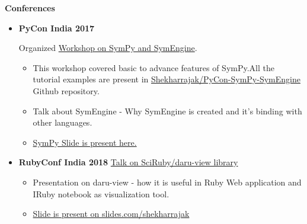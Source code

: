 \documentclass[letterpaper,12pt]{article}[leftmargin=*]
\def \entryspacing {-0pt}
\renewcommand{\section}[2]{\vspace{5pt}
  \colorbox{secondary}{\color{white}\raggedbottom\normalsize\textbf{{#1}{\hspace{7pt}#2}}}
}
\newcommand{\resumeEntryStart}{\begin{itemize}[leftmargin=2.5mm]}
\newcommand{\resumeEntryEnd}{\end{itemize}\vspace{\entryspacing}}
\newcommand{\resumeEntryS}[2]{
  \item[]\small{
    \textbf{\color{primary}#1 }{ #2 \vspace{-6pt}}
  }
}
\begin{document}
\section{\faBook}{Conferences}
 \resumeEntryStart
  \resumeEntryS{PyCon India 2017} {Organized \href{https://shekharrajak.github.io/blog/Talks/SymPy/PyConIndia-Delhi-2017}{ Workshop on SymPy and SymEngine}.
  \begin{itemize}
      \item This workshop covered basic to advance features of SymPy.All the tutorial examples are present in \href{https://github.com/Shekharrajak/PyCon-SymPy-SymEngine}{Shekharrajak/PyCon-SymPy-SymEngine} Github repository.

      \item Talk about SymEngine - Why SymEngine is created and it's binding with other languages.

      \item \href{https://shekharrajak.github.io/PyCon-SymPy-SymEngine/slides-pyconindia2017}{SymPy Slide is present here. }
  \end{itemize}}

  \resumeEntryS{RubyConf India 2018 } {\href{https://shekharrajak.github.io/blog/Talks/SciRuby/RubyConfIndia-Bangalore-2018}{Talk
on SciRuby/daru-view library}}
\begin{itemize}
    \item Presentation on daru-view - how it is useful in Ruby Web application and IRuby notebook as visualization tool.
    \item \href{https://slides.com/shekharrajak/beauty-of-javascript-charts-using-daru-view}{Slide is present on slides.com/shekharrajak}
\end{itemize}

 \resumeEntryEnd
\end{document}
